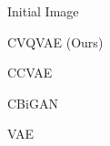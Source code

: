 \begin{figure}[t]
\centering
    \begin{subfigure}[b]{0.2\textwidth}
        \begin{flushright}
        
        Initial Image
        
        \vspace{0.35cm}
        
        CVQVAE (Ours)
        
        \vspace{0.35cm}
        
        CCVAE
        
        \vspace{0.35cm}
        
        CBiGAN
        
        \vspace{0.35cm}
        
        VAE
        
        \vspace{0.22cm}
        
        \end{flushright}
        
    \end{subfigure}
    \begin{subfigure}[b]{0.3\textwidth}
        \centering
        

\end{subfigure}
\end{figure}
